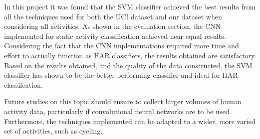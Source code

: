 In this project it was found that the SVM classifier achieved the best results from all the techniques used for both the UCI dataset and our dataset when considering all activities.
As shown in the evaluation section, the CNN implemented for static activity classification achieved near equal results.
Considering the fact that the CNN implementations required more time and effort to actually function as HAR classifiers, the results obtained are satisfactory.
Based on the results obtained, and the quality of the data constructed, the SVM classifier has shown to be the better performing classifier and ideal for HAR classifcation.

Future studies on this topic should ensure to collect larger volumes of human activity data, particularly if convolutional neural networks are to be used. Furthermore,
the techniques implemented can be adapted to a wider, more varied set of activities, such as cycling.